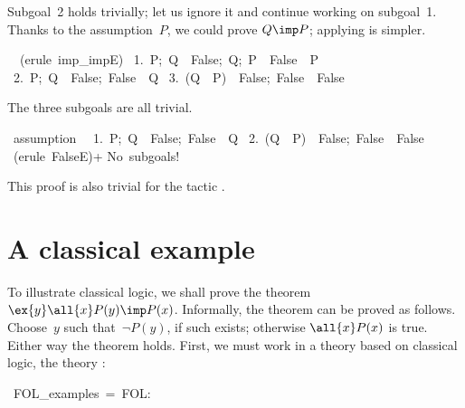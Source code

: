 Subgoal~2 holds trivially; let us ignore it and continue working on
subgoal~1.  Thanks to the assumption~$P$, we could prove $Q\imp P$;
applying  is simpler.
\begin{isabelle}
\ \ (erule\ imp\_impE)\isanewline
\ 1.\ \isasymlbrakk P;\ Q\ \isasymlongrightarrow \ False;\ Q;\ P\ \isasymlongrightarrow \ False\isasymrbrakk \ \isasymLongrightarrow \ P\isanewline
\ 2.\ \isasymlbrakk P;\ Q\ \isasymlongrightarrow \ False;\ False\isasymrbrakk \ \isasymLongrightarrow \ Q\isanewline
\ 3.\ \isasymlbrakk (Q\ \isasymlongrightarrow \ P)\ \isasymlongrightarrow \ False;\ False\isasymrbrakk \ \isasymLongrightarrow \ False%
\end{isabelle}
The three subgoals are all trivial.
\begin{isabelle}
\ assumption\ \isanewline
\ 1.\ \isasymlbrakk P;\ Q\ \isasymlongrightarrow \ False;\
False\isasymrbrakk \ \isasymLongrightarrow \ Q\isanewline
\ 2.\ \isasymlbrakk (Q\ \isasymlongrightarrow \ P)\
\isasymlongrightarrow \ False;\ False\isasymrbrakk \
\isasymLongrightarrow \ False%
\isanewline
\isacommand{apply}\ (erule\ FalseE)+\isanewline
No\ subgoals!\isanewline
{}
\end{isabelle}
This proof is also trivial for the \ML{} tactic .


\section{A classical example} \label{fol-cla-example}
To illustrate classical logic, we shall prove the theorem
$\ex{y}\all{x}P(y)\imp P(x)$.  Informally, the theorem can be proved as
follows.  Choose~$y$ such that~$\neg P(y)$, if such exists; otherwise
$\all{x}P(x)$ is true.  Either way the theorem holds.  First, we must
work in a theory based on classical logic, the theory \isa{FOL}:
\begin{isabelle}
\isacommand{theory}\ FOL\_examples\ =\ FOL:
\end{isabelle}

